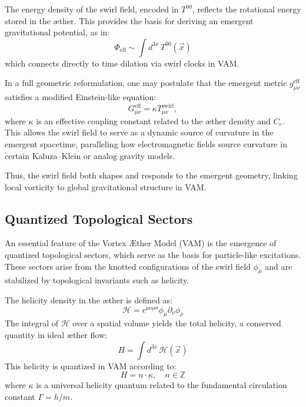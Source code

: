 \documentclass[a4paper,12pt]{article}
\begin{document}
        The energy density of the swirl field, encoded in $T^{00}$, reflects the rotational energy stored in the æther. This provides the basis for deriving an emergent gravitational potential, as in:
        \begin{equation}
            \Phi_{\text{eff}} \sim \int d^{3x} \, T^{00}(\vec{x})
        \end{equation}
        which connects directly to time dilation via swirl clocks in VAM.

        In a full geometric reformulation, one may postulate that the emergent metric $g^{\text{eff}}_{\mu\nu}$ satisfies a modified Einstein-like equation:
        \begin{equation}
            G_{\mu\nu}^{\text{eff}} = \kappa T_{\mu\nu}^{\text{swirl}},
        \end{equation}
        where $\kappa$ is an effective coupling constant related to the æther density and $C_e$. This allows the swirl field to serve as a dynamic source of curvature in the emergent spacetime, paralleling how electromagnetic fields source curvature in certain Kaluza--Klein or analog gravity models.

        Thus, the swirl field both shapes and responds to the emergent geometry, linking local vorticity to global gravitational structure in VAM.


        \subsection{Quantized Topological Sectors}
        An essential feature of the Vortex Æther Model (VAM) is the emergence of quantized topological sectors, which serve as the basis for particle-like excitations. These sectors arise from the knotted configurations of the swirl field $\phi_\mu$ and are stabilized by topological invariants such as helicity.

        The helicity density in the æther is defined as:
        \begin{equation}
            \mathcal{H} = \epsilon^{\mu\nu\rho\sigma} \phi_\mu \partial_\nu \phi_\rho
        \end{equation}
        The integral of $\mathcal{H}$ over a spatial volume yields the total helicity, a conserved quantity in ideal æther flow:
        \begin{equation}
            H = \int d^{3x} \, \mathcal{H}(\vec{x})
        \end{equation}
        This helicity is quantized in VAM according to:
        \begin{equation}
            H = n \cdot \kappa, \quad n \in \mathbb{Z}
        \end{equation}
        where $\kappa$ is a universal helicity quantum related to the fundamental circulation constant $\Gamma = h/m$.
\end{document}
